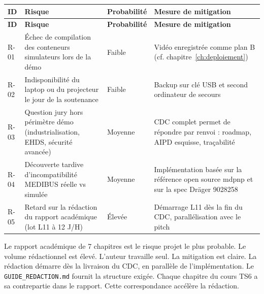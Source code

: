 \bridgezebra
\begin{longtable}{p{1.2cm}p{6.5cm}p{2cm}p{4.5cm}}
  \toprule
  \rowcolor{bridgeblue!90}
  {\color{white}\bfseries ID} & {\color{white}\bfseries Risque} & {\color{white}\bfseries Probabilité} & {\color{white}\bfseries Mesure de mitigation} \\
  \midrule
  \endfirsthead
  \toprule
  \rowcolor{bridgeblue!90}
  {\color{white}\bfseries ID} & {\color{white}\bfseries Risque} & {\color{white}\bfseries Probabilité} & {\color{white}\bfseries Mesure de mitigation} \\
  \midrule
  \endhead
  \bottomrule
  \endfoot
  R-01 & Échec de compilation des conteneurs simulateurs lors de la démo & Faible & Vidéo enregistrée comme plan B (cf. chapitre~\ref{ch:deploiement}) \\
  R-02 & Indisponibilité du laptop ou du projecteur le jour de la soutenance & Faible & Backup sur clé USB et second ordinateur de secours \\
  R-03 & Question jury hors périmètre démo (industrialisation, EHDS, sécurité avancée) & Moyenne & CDC complet permet de répondre par renvoi : roadmap, AIPD esquisse, traçabilité \\
  R-04 & Découverte tardive d'incompatibilité MEDIBUS réelle vs simulée & Moyenne & Implémentation basée sur la référence open source mdpnp et sur la spec Dräger 9028258 \\
  R-05 & Retard sur la rédaction du rapport académique (lot L11 à 12 J/H) & Élevée & Démarrage L11 dès la fin du CDC, parallélisation avec le pitch \\
\end{longtable}

\begin{bridgewarn}
Le rapport académique de 7 chapitres est le risque projet le plus probable. Le volume rédactionnel est élevé. L'auteur travaille seul. La mitigation est claire. La rédaction démarre dès la livraison du CDC, en parallèle de l'implémentation. Le \texttt{GUIDE\_REDACTION.md} fournit la structure exigée. Chaque chapitre du cours TS6 a sa contrepartie dans le rapport. Cette correspondance accélère la rédaction.
\end{bridgewarn}
